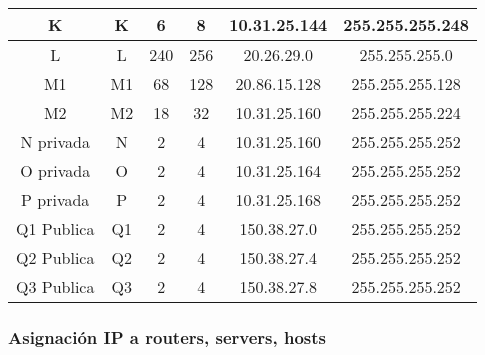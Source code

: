 \documentclass[12pt,a4paper,spanish]{article}
\begin{document}
\begin{tabular}{|c|c|c|c|c|c|}
	\hline
	K & K & 6 & 8 & 10.31.25.144 & 255.255.255.248 \\
	\hline
	L & L & 240 & 256 & 20.26.29.0 & 255.255.255.0 \\
	\hline
	M1 & M1 & 68 & 128 & 20.86.15.128 & 255.255.255.128 \\
	\hline
	M2 & M2 & 18 & 32 & 10.31.25.160 & 255.255.255.224 \\
	\hline
	N privada & N & 2 & 4 & 10.31.25.160 & 255.255.255.252 \\
	\hline
	O privada & O & 2 & 4 & 10.31.25.164 & 255.255.255.252 \\
	\hline
	P privada & P & 2 & 4 & 10.31.25.168 & 255.255.255.252 \\
	\hline
	Q1 Publica & Q1 & 2 & 4 & 150.38.27.0 & 255.255.255.252 \\
	\hline
	Q2 Publica & Q2 & 2 & 4 & 150.38.27.4 & 255.255.255.252 \\
	\hline
	Q3 Publica & Q3 & 2 & 4 & 150.38.27.8 & 255.255.255.252 \\
	\hline
\end{tabular}



\subsubsection{Asignación IP a routers, servers, hosts}
\end{document}
